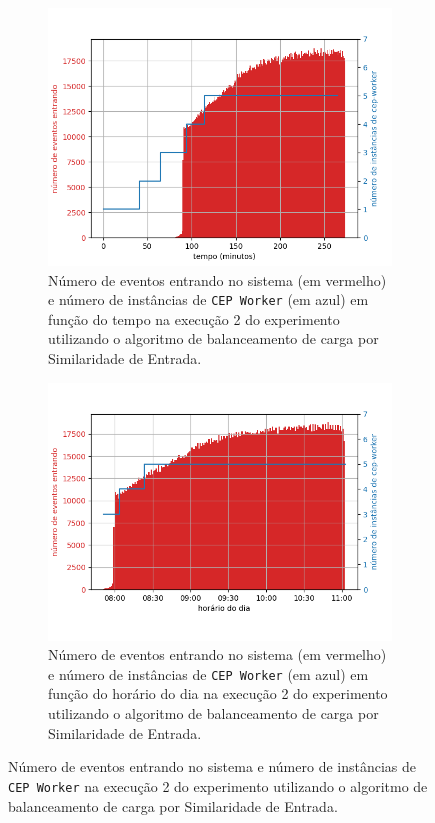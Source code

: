 \begin{figure}[h]
\centering
\begin{subfigure}{0.9\textwidth}
\centering
\includegraphics[width=\textwidth]{figuras/graphics/carga_e_workers_total7-dez-is.png}
\caption{Número de eventos entrando no sistema (em vermelho) e número de instâncias de \texttt{CEP Worker} (em azul) em função do tempo na execução 2 do experimento utilizando o algoritmo de balanceamento de carga por Similaridade de Entrada.}
\label{fig:workers_and_load_total-7-dez-is}
\end{subfigure}%

\begin{subfigure}{\textwidth}
\centering
\includegraphics[width=\textwidth]{figuras/graphics/carga_e_workers_horario7-dez-is.png}
\caption{Número de eventos entrando no sistema (em vermelho) e número de instâncias de \texttt{CEP Worker} (em azul) em função do horário do dia na execução 2 do experimento utilizando o algoritmo de balanceamento de carga por Similaridade de Entrada.}
\label{fig:workers_and_load_SPtrans-7-dez-is}
\end{subfigure}%
\caption{Número de eventos entrando no sistema e número de instâncias de \texttt{CEP Worker} na execução 2 do experimento utilizando o algoritmo de balanceamento de carga por Similaridade de Entrada.}
\end{figure}






